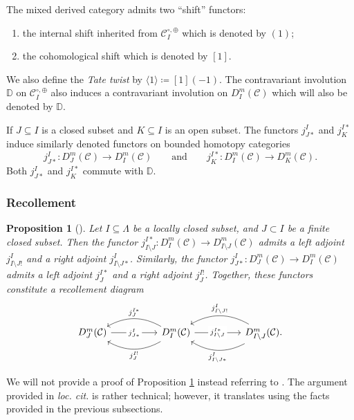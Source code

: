 \documentclass{amsart}
\newcommand{\scrC}{\mathcal{C}}
\newcommand{\DD}{\mathbb{D}}
\newtheorem{proposition}[subsubsection]{Proposition}
\theoremstyle{definition}
\numberwithin{equation}{subsection}
\begin{document}
The mixed derived category admits two ``shift'' functors:
\begin{enumerate}
    \item the internal shift inherited from $\scrC_{I}^{\circ, \oplus}$ which is denoted by $(1)$;
    \item the cohomological shift which is denoted by $[1]$.
\end{enumerate} 
We also define the \emph{Tate twist} by $\langle 1 \rangle \coloneq [1] (-1)$.
The contravariant involution $\DD$ on $\scrC_{I}^{\circ, \oplus}$ also induces a contravariant involution on $D_I^m (\scrC)$ which will also be denoted by $\DD$.

If $J \subseteq I$ is a closed subset and $K \subseteq I$ is an open subset. The functors $j_{J*}^I$ and $j_{K}^{I*}$ induce similarly denoted functors on bounded homotopy categories
\[j_{J*}^I : D_J^m (\scrC) \to D_I^m (\scrC) \qquad\text{and}\qquad j_{K}^{I*} : D_I^m (\scrC) \to D_K^m (\scrC).\]
Both $j_{J*}^I$ and $j_{K}^{I*}$ commute with $\DD$.

\subsubsection{Recollement}

\begin{proposition}[{\cite[Proposition 5.6]{ARV}}]\label{prop:recollement}
    Let $I \subseteq \Lambda$ be a locally closed subset, and $J \subset I$ be a finite closed subset.
    Then the functor $j_{I \setminus J}^{I*} : D_I^m (\scrC) \to D_{I \setminus J}^m (\scrC)$ admits a left adjoint  $j_{I \setminus J !}^{I}$ and a right adjoint $j_{I \setminus J *}^{I}$.
    Similarly, the functor $j_{J*}^I : D_J^m (\scrC) \to D_I^m (\scrC)$ admits a left adjoint $j_{J}^{I*}$ and a right adjoint $j_J^{I!}$.
    Together, these functors constitute a recollement diagram
    \[\begin{tikzcd}
        {D_J^m (\scrC)} \arrow[rr, "j_{J*}^{I}" description] &  & {D_I^m (\scrC)} \arrow[rr, "j_{I \setminus J}^{I*}" description] \arrow[ll, "j_J^{I*}"', bend right, shift left] \arrow[ll, "j_J^{I!}", bend left] &  & {D_{I \setminus J}^m (\scrC).} \arrow[ll, "j_{I \setminus J !}^{I}"', bend right] \arrow[ll, "j_{I \setminus J *}^{I}", bend left]
        \end{tikzcd}\]
\end{proposition}

We will not provide a proof of Proposition \ref{prop:recollement} instead referring to \cite{ARV}.
The argument provided in \emph{loc. cit.} is rather technical; however, it translates using the facts provided in the previous subsections.
\end{document}
